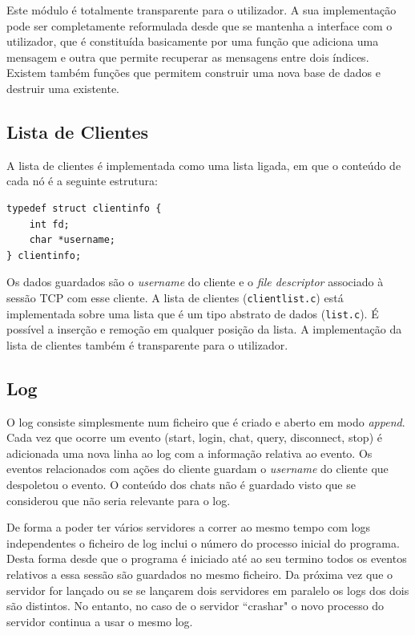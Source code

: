 \documentclass[a4paper]{article}
\begin{document}
	Este módulo é totalmente transparente para o utilizador. A sua implementação pode ser completamente reformulada desde que se mantenha a interface com o utilizador, que é constituída basicamente por uma função que adiciona uma mensagem e outra que permite recuperar as mensagens entre dois índices. Existem também funções que permitem construir uma nova base de dados e destruir uma existente.

	\subsection{Lista de Clientes} 
	
	A lista de clientes é implementada como uma lista ligada, em que o conteúdo de cada nó é a seguinte estrutura: 
	
	\begin{verbatim}
typedef struct clientinfo { 
    int fd;  
    char *username; 
} clientinfo; 
	\end{verbatim}

 
Os dados guardados são o \textit{username} do cliente e o \textit{file descriptor} associado à sessão TCP com esse cliente. A lista de clientes (\texttt{clientlist.c}) está implementada sobre uma lista que é um tipo abstrato de dados (\texttt{list.c}). É possível a inserção e remoção em qualquer posição da lista. A implementação da lista de clientes também é transparente para o utilizador.

	\subsection{Log} 
 
	O log consiste simplesmente num ficheiro que é criado e aberto em modo \textit{append}. Cada vez que ocorre um evento (start, login, chat, query, disconnect, stop) é adicionada uma nova linha ao log com a informação relativa ao evento. Os eventos relacionados com ações do cliente guardam o \textit{username} do cliente que despoletou o evento. O conteúdo dos chats não é guardado visto que se considerou que não seria relevante para o log. 

	De forma a poder ter vários servidores a correr ao mesmo tempo com logs independentes o ficheiro de log inclui o número do processo inicial do programa. Desta forma desde que o programa é iniciado até ao seu termino todos os eventos relativos a essa sessão são guardados no mesmo ficheiro. Da próxima vez que o servidor for lançado ou se se lançarem dois servidores em paralelo os logs dos dois são distintos. No entanto, no caso de o servidor ``crashar" o novo processo do servidor continua a usar o mesmo log. 
\end{document}
